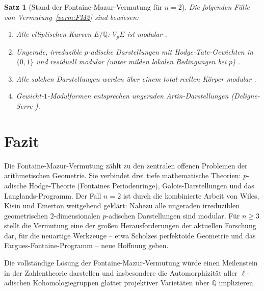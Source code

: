 \documentclass[12pt,a4paper]{amsart}
\newtheorem{satz}[theorem]{Satz}
\theoremstyle{definition}
\theoremstyle{remark}
\newcommand{\Q}{\mathbb{Q}}
\begin{document}
\begin{satz}[Stand der Fontaine-Mazur-Vermutung für $n=2$]
  Die folgenden Fälle von Vermutung~\ref{verm:FM2} sind bewiesen:
  \begin{enumerate}[label=(\roman*)]
    \item Alle elliptischen Kurven $E/\Q$: $V_pE$ ist modular \cite{BCDT2001}.
    \item Ungerade, irreduzible $p$-adische Darstellungen mit Hodge-Tate-Gewichten
      in $\{0,1\}$ und residuell modular (unter milden lokalen Bedingungen bei $p$)
      \cite{Kisin2009, Emerton2010}.
    \item Alle solchen Darstellungen werden über einem total-reellen Körper modular
      \cite{Taylor2002}.
    \item Gewicht-$1$-Modulformen entsprechen ungeraden Artin-Darstellungen
      (Deligne-Serre \cite{DS1974}).
  \end{enumerate}
\end{satz}

\section{Fazit}\label{sec:fazit}

Die Fontaine-Mazur-Vermutung zählt zu den zentralen offenen Problemen der arithmetischen
Geometrie. Sie verbindet drei tiefe mathematische Theorien:
$p$-adische Hodge-Theorie (Fontaines Periodenringe), Galois-Darstellungen und das
Langlands-Programm. Der Fall $n=2$ ist durch die kombinierte Arbeit von Wiles, Kisin
und Emerton weitgehend geklärt: Nahezu alle ungeraden irreduziblen geometrischen
$2$-dimensionalen $p$-adischen Darstellungen sind modular.
Für $n \geq 3$ stellt die Vermutung eine der großen Herausforderungen der aktuellen
Forschung dar, für die neuartige Werkzeuge -- etwa Scholzes perfektoide Geometrie
und das Fargues-Fontaine-Programm -- neue Hoffnung geben.

Die vollständige Lösung der Fontaine-Mazur-Vermutung würde einen Meilenstein in der
Zahlentheorie darstellen und insbesondere die Automorphizität aller $\ell$-adischen
Kohomologiegruppen glatter projektiver Varietäten über $\Q$ implizieren.
\end{document}
